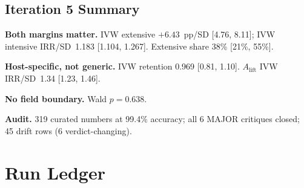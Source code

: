\documentclass[11pt,letterpaper]{article}
\begin{document}
\subsection{Iteration 5 Summary}

\textbf{Both margins matter.} IVW extensive $+6.43$~pp/SD [4.76, 8.11]; IVW intensive IRR/SD~1.183 [1.104, 1.267]. Extensive share 38\% [21\%, 55\%].

\textbf{Host-specific, not generic.} IVW retention 0.969 [0.81, 1.10]. $A_{\mathrm{lift}}$ IVW IRR/SD~1.34 [1.23, 1.46].

\textbf{No field boundary.} Wald $p = 0.638$.

\textbf{Audit.} 319 curated numbers at 99.4\% accuracy; all 6 MAJOR critiques closed; 45 drift rows (6 verdict-changing).


\section{Run Ledger}
\label{sec:ledger}
\end{document}
